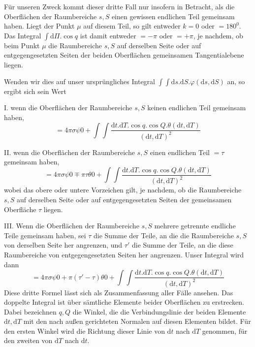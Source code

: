 Für unseren Zweck kommt dieser dritte Fall nur insofern in Betracht, als die Oberflächen der Raumbereiche $s,S$ einen gewissen endlichen Teil gemeinsam haben. Liegt der Punkt $\mu$ auf diesem Teil, so gilt entweder $k=0$ oder $=180^0$. Das Integral $\int\mathrm{d}\Pi.\cos q$ ist damit entweder $=-\pi$ oder $=+\pi$, je nachdem, ob beim Punkt $\mu$ die Raumbereiche $s,S$ auf derselben Seite oder auf entgegengesetzten Seiten der beiden Oberflächen gemeinsamen Tangentialebene liegen.

Wenden wir dies auf unser ursprüngliches Integral $\int\int\mathrm{d}s.\mathrm{d}S.\varphi(\mathrm{d}s,\mathrm{d}S)$ an, so ergibt sich sein Wert

I. wenn die Oberflächen der Raumbereiche $s,S$ keinen endlichen Teil gemeinsam haben,
\[
=4\pi\sigma\psi0+\int\int\frac{\mathrm{d}t.\mathrm{d}T.\cos q.\cos Q.\theta(\mathrm{d}t,\mathrm{d}T)}{(\mathrm{d}t,\mathrm{d}T)^2}
\]

II. wenn die Oberflächen der Raumbereiche $s,S$ einen endlichen Teil $=\tau$ gemeinsam haben,
\[
=4\pi\sigma\psi0\mp\pi\tau\theta0+\int\int\frac{\mathrm{d}t.\mathrm{d}T.\cos q.\cos Q.\theta(\mathrm{d}t,\mathrm{d}T)}{(\mathrm{d}t,\mathrm{d}T)^2}
\]
wobei das obere oder untere Vorzeichen gilt, je nachdem, ob die Raumbereiche $s,S$ auf derselben Seite oder auf entgegengesetzten Seiten der gemeinsamen Oberfläche $\tau$ liegen.

III. Wenn die Oberflächen der Raumbereiche $s,S$ mehrere getrennte endliche Teile gemeinsam haben, sei $\tau$ die Summe der Teile, an die die Raumbereiche $s,S$ von derselben Seite her angrenzen, und $\tau'$ die Summe der Teile, an die diese Raumbereiche von entgegengesetzten Seiten her angrenzen. Unser Integral wird dann
\[
=4\pi\sigma\psi0+\pi(\tau'-\tau)\theta0+\int\int\frac{\mathrm{d}t.\mathrm{d}T.\cos q.\cos Q.\theta(\mathrm{d}t,\mathrm{d}T)}{(\mathrm{d}t,\mathrm{d}T)^2}
\]
Diese dritte Formel lässt sich als Zusammenfassung aller Fälle ansehen. Das doppelte Integral ist über sämtliche Elemente beider Oberflächen zu erstrecken. Dabei bezeichnen $q,Q$ die Winkel, die die Verbindungslinie der beiden Elemente $\mathrm{d}t,\mathrm{d}T$ mit den nach außen gerichteten Normalen auf diesen Elementen bildet. Für den ersten Winkel wird die Richtung dieser Linie von $\mathrm{d}t$ nach $\mathrm{d}T$ genommen, für den zweiten von $\mathrm{d}T$ nach $\mathrm{d}t$.

